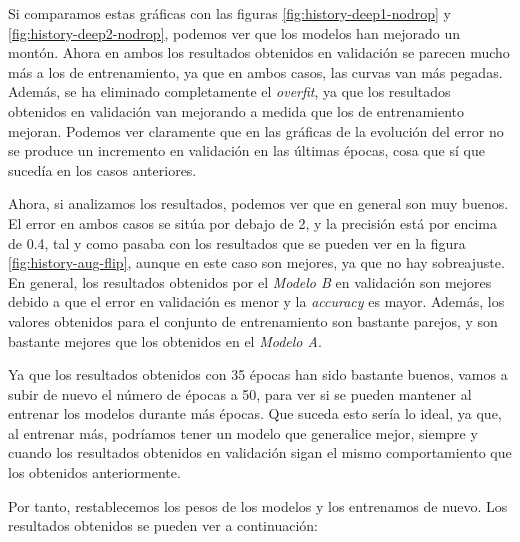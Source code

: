 \documentclass[11pt,a4paper]{article}
\begin{document}
Si comparamos estas gráficas con las figuras \ref{fig:history-deep1-nodrop} y \ref{fig:history-deep2-nodrop}, podemos ver
que los modelos han mejorado un montón. Ahora en ambos los resultados obtenidos en validación se parecen mucho más a los
de entrenamiento, ya que en ambos casos, las curvas van más pegadas. Además, se ha eliminado completamente el \textit{overfit},
ya que los resultados obtenidos en validación van mejorando a medida que los de entrenamiento mejoran. Podemos ver
claramente que en las gráficas de la evolución del error no se produce un incremento en validación en las últimas épocas,
cosa que sí que sucedía en los casos anteriores.

Ahora, si analizamos los resultados, podemos ver que en general son muy buenos. El error en ambos casos se sitúa por debajo
de 2, y la precisión está por encima de 0.4, tal y como pasaba con los resultados que se pueden ver en la figura
\ref{fig:history-aug-flip}, aunque en este caso son mejores, ya que no hay sobreajuste. En general, los resultados obtenidos
por el \textit{Modelo B} en validación son mejores debido a que el error en validación es menor y la \textit{accuracy} es
mayor. Además, los valores obtenidos para el conjunto de entrenamiento son bastante parejos, y son bastante mejores que
los obtenidos en el \textit{Modelo A}.

Ya que los resultados obtenidos con 35 épocas han sido bastante buenos, vamos a subir de nuevo el número de épocas a 50,
para ver si se pueden mantener al entrenar los modelos durante más épocas. Que suceda esto sería lo ideal, ya que, al entrenar
más, podríamos tener un modelo que generalice mejor, siempre y cuando los resultados obtenidos en validación sigan
el mismo comportamiento que los obtenidos anteriormente.

Por tanto, restablecemos los pesos de los modelos y los entrenamos de nuevo. Los resultados obtenidos se pueden
ver a continuación:
\end{document}
